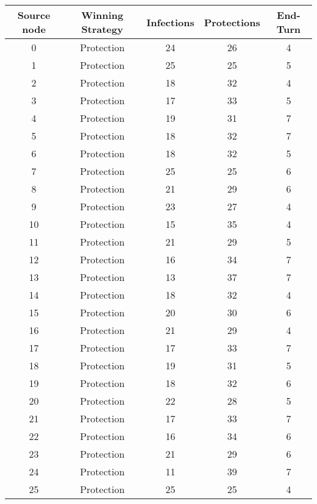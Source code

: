 \documentclass[results.tex]{subfiles}
\begin{document}
\begin{center}
  \begin{tabular}{| c || c | c | c | c |}
    \hline
    {\bfseries Source node} & {\bfseries Winning Strategy} & {\bfseries Infections} & {\bfseries Protections} & {\bfseries End-Turn} \\  %
    \hline\hline
    0 & Protection & 24 & 26 & 4 \\ 
    \hline
    1 & Protection & 25 & 25 & 5 \\ 
    \hline
    2 & Protection & 18 & 32 & 4 \\ 
    \hline
    3 & Protection & 17 & 33 & 5 \\ 
    \hline
    4 & Protection & 19 & 31 & 7 \\ 
    \hline
    5 & Protection & 18 & 32 & 7 \\ 
    \hline
    6 & Protection & 18 & 32 & 5 \\ 
    \hline
    7 & Protection & 25 & 25 & 6 \\ 
    \hline
    8 & Protection & 21 & 29 & 6 \\ 
    \hline
    9 & Protection & 23 & 27 & 4 \\ 
    \hline
    10 & Protection & 15 & 35 & 4 \\ 
    \hline
    11 & Protection & 21 & 29 & 5 \\ 
    \hline
    12 & Protection & 16 & 34 & 7 \\ 
    \hline
    13 & Protection & 13 & 37 & 7 \\ 
    \hline
    14 & Protection & 18 & 32 & 4 \\ 
    \hline
    15 & Protection & 20 & 30 & 6 \\ 
    \hline
    16 & Protection & 21 & 29 & 4 \\ 
    \hline
    17 & Protection & 17 & 33 & 7 \\ 
    \hline
    18 & Protection & 19 & 31 & 5 \\ 
    \hline
    19 & Protection & 18 & 32 & 6 \\ 
    \hline
    20 & Protection & 22 & 28 & 5 \\ 
    \hline
    21 & Protection & 17 & 33 & 7 \\ 
    \hline
    22 & Protection & 16 & 34 & 6 \\ 
    \hline
    23 & Protection & 21 & 29 & 6 \\ 
    \hline
    24 & Protection & 11 & 39 & 7 \\ 
    \hline
    25 & Protection & 25 & 25 & 4 \\ 

\end{tabular}
\end{center}
\end{document}
